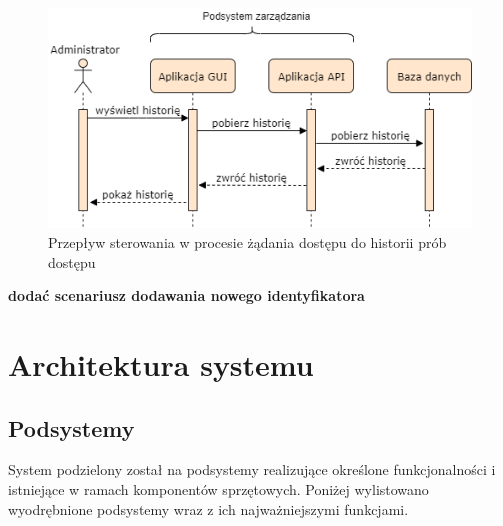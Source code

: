             \begin{figure}[]
                \centering
                \includegraphics[width=.7\linewidth]{chapters/images/sequence4.png}
                \caption{Przepływ sterowania w procesie żądania dostępu do historii prób dostępu}
                \label{fig:sequence4}
            \end{figure}

            \textbf{dodać scenariusz dodawania nowego identyfikatora}

        \section{Architektura systemu}

            \subsection{Podsystemy}

                System podzielony został na podsystemy realizujące określone funkcjonalności i istniejące w ramach komponentów sprzętowych. Poniżej wylistowano wyodrębnione podsystemy wraz z ich najważniejszymi funkcjami. 

